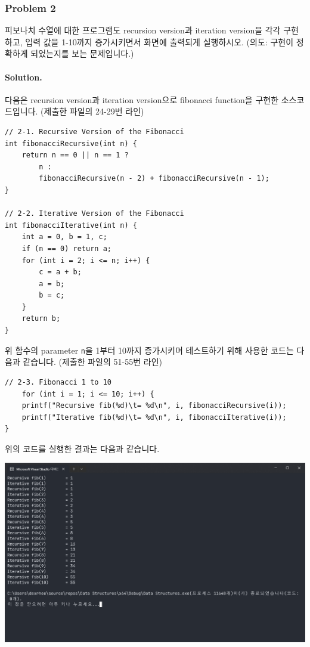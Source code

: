 \subsubsection{Problem 2}
피보나치 수열에 대한 프로그램도 recursion version과 iteration version을 각각 구현하고,
입력 값을 1-10까지 증가시키면서 화면에 출력되게 실행하시오.
(의도: 구현이 정확하게 되었는지를 보는 문제입니다.)

\paragraph{Solution.}
다음은 recursion version과 iteration version으로 fibonacci function을 구현한 소스코드입니다. (제출한 파일의 24-29번 라인)
\begin{verbatim}
// 2-1. Recursive Version of the Fibonacci
int fibonacciRecursive(int n) {
    return n == 0 || n == 1 ?
        n :
        fibonacciRecursive(n - 2) + fibonacciRecursive(n - 1);
}

// 2-2. Iterative Version of the Fibonacci
int fibonacciIterative(int n) {
    int a = 0, b = 1, c;
    if (n == 0) return a;
    for (int i = 2; i <= n; i++) {
        c = a + b;
        a = b;
        b = c;
    }
    return b;
}
\end{verbatim}
위 함수의 parameter \texttt{n}을 1부터 10까지 증가시키며 테스트하기 위해 사용한 코드는 다음과 같습니다. (제출한 파일의 51-55번 라인)
\begin{verbatim}
// 2-3. Fibonacci 1 to 10
    for (int i = 1; i <= 10; i++) {
    printf("Recursive fib(%d)\t= %d\n", i, fibonacciRecursive(i));
    printf("Iterative fib(%d)\t= %d\n", i, fibonacciIterative(i));
}
\end{verbatim}
\newpage
위의 코드를 실행한 결과는 다음과 같습니다.

\includegraphics[width=\textwidth]{./img/2.png}
\newpage
